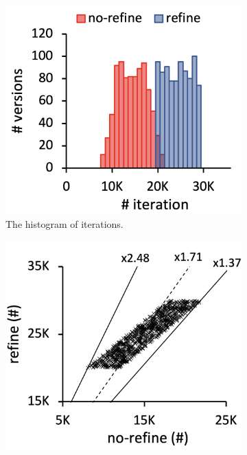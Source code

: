 \begin{figure}
  \centering
  \begin{subfigure}[b]{0.24\textwidth}
    \includegraphics[width=\textwidth]{img/compare-iter}
    \caption{The histogram of iterations.}
  \end{subfigure}
  \begin{subfigure}[b]{0.24\textwidth}
    \includegraphics[width=\textwidth]{img/ratio-iter}

\end{subfigure}
\end{figure}
